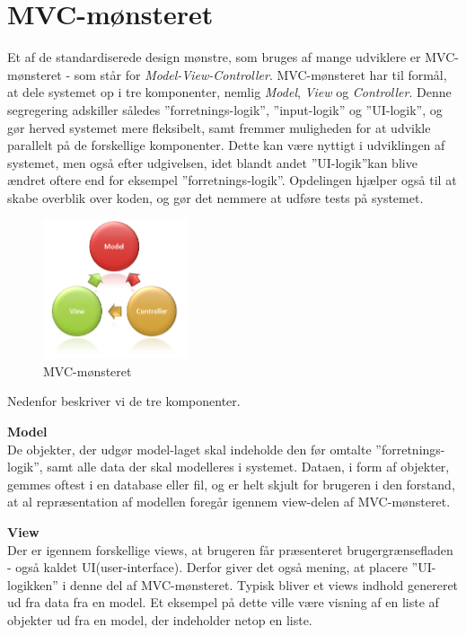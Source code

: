 \section{MVC-mønsteret}\label{MVC}
Et af de standardiserede design mønstre, som bruges af mange udviklere er MVC-mønsteret - som står for \textit{Model-View-Controller}.
MVC-mønsteret har til formål, at dele systemet op i tre komponenter, nemlig \textit{Model}, \textit{View} og \textit{Controller}.
Denne segregering adskiller således ''forretnings-logik'', ''input-logik'' og ''UI-logik'', og gør herved systemet mere fleksibelt, samt fremmer muligheden for at udvikle parallelt på de forskellige komponenter.
Dette kan være nyttigt i udviklingen af systemet, men også efter udgivelsen, idet blandt andet ''UI-logik''kan blive ændret oftere end for eksempel ''forretnings-logik''.
Opdelingen hjælper også til at skabe overblik over koden, og gør det nemmere at udføre tests på systemet. \citep{MVC_Overview}

\begin{figure}
	\vspace{-20pt}
	\begin{center}
		\includegraphics[width=0.38\textwidth]{images/Images/mvc.png}
	\end{center}
	\vspace{-20pt}
	\caption{MVC-mønsteret}
	\vspace{-20pt}
\end{figure}


Nedenfor beskriver vi de tre komponenter.

\textbf{Model}\\
De objekter, der udgør model-laget skal indeholde den før omtalte ''forretnings-logik'', samt alle data der skal modelleres i systemet.
Dataen, i form af objekter, gemmes oftest i en database eller fil, og er helt skjult for brugeren i den forstand, at al repræsentation af modellen foregår igennem view-delen af MVC-mønsteret.

\textbf{View}\\
Der er igennem forskellige views, at brugeren får præsenteret brugergrænsefladen - også kaldet UI(user-interface).
Derfor giver det også mening, at placere ''UI-logikken'' i denne del af MVC-mønsteret.
Typisk bliver et views indhold genereret ud fra data fra en model.
Et eksempel på dette ville være visning af en liste af objekter ud fra en model, der indeholder netop en liste.


